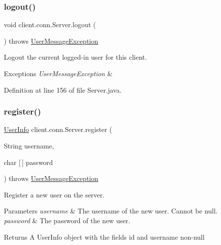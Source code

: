 \subsubsection{\texorpdfstring{logout()}{logout()}}
{\footnotesize\ttfamily void client.\+conn.\+Server.\+logout (\begin{DoxyParamCaption}{ }\end{DoxyParamCaption}) throws \hyperlink{classpt_1_1up_1_1fe_1_1lpro1613_1_1sharedlib_1_1exceptions_1_1_user_message_exception}{User\+Message\+Exception}}

Logout the current logged-\/in user for this client. 
\begin{DoxyExceptions}{Exceptions}
{\em User\+Message\+Exception} & \\
\hline
\end{DoxyExceptions}


Definition at line 156 of file Server.\+java.

\hypertarget{classclient_1_1conn_1_1_server_a945189dab00f6350cb5a444a910c4dd5}{}\label{classclient_1_1conn_1_1_server_a945189dab00f6350cb5a444a910c4dd5} 
\subsubsection{\texorpdfstring{register()}{register()}}
{\footnotesize\ttfamily \hyperlink{classpt_1_1up_1_1fe_1_1lpro1613_1_1sharedlib_1_1structs_1_1_user_info}{User\+Info} client.\+conn.\+Server.\+register (\begin{DoxyParamCaption}\item[{String}]{username,  }\item[{char \mbox{[}$\,$\mbox{]}}]{password }\end{DoxyParamCaption}) throws \hyperlink{classpt_1_1up_1_1fe_1_1lpro1613_1_1sharedlib_1_1exceptions_1_1_user_message_exception}{User\+Message\+Exception}}

Register a new user on the server. 
\begin{DoxyParams}{Parameters}
{\em username} & The username of the new user. Cannot be null. \\
\hline
{\em password} & The password of the new user. \\
\hline
\end{DoxyParams}
\begin{DoxyReturn}{Returns}
A {\ttfamily User\+Info} object with the fields {\ttfamily id} and {\ttfamily username} non-\/null 
\end{DoxyReturn}

